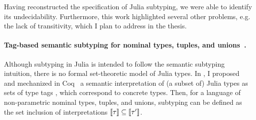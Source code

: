 Having reconstructed the specification of Julia subtyping,
we were able to identify its undecidability. Furthermore, this work highlighted
several other problems, e.g. the lack of transitivity,
which I plan to address in the thesis.

\paragraph{Tag-based semantic subtyping for nominal types, tuples, and
unions~\cite{TODO}.}
Although subtyping in Julia is intended to follow the semantic subtyping
intuition, there is no formal set-theoretic model of Julia types.
In \cite{TODO}, I proposed and mechanized in Coq~\cite{TODO}
a semantic interpretation of (a subset of) Julia
types \ty as sets of type tags \gty, which correspond to concrete types.
Then, for a language of non-parametric nominal types, tuples, and unions,
subtyping can be defined as the set inclusion of interpretations
$\llbracket \tau \rrbracket \subseteq \llbracket \tau' \rrbracket$.

